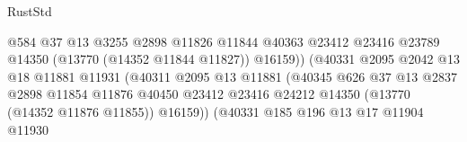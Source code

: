 \begin{lexlean}{RustStd}
\begin{coremodule}
                                                @584
                                                @37
                                                @13
                                                @3255
                                                @2898
                                                @11826
                                                @11844
                                                @40363
                                                @23412
                                                @23416
                                                @23789
                                                @14350
                                                (@13770 (@14352 @11844 @11827))
                                                @16159))
                                            (@40331
                                              @2095
                                              @2042
                                              @13
                                              @18
                                              @11881
                                              @11931
                                              (@40311
                                                @2095
                                                @13
                                                @11881
                                                (@40345
                                                  @626
                                                  @37
                                                  @13
                                                  @2837
                                                  @2898
                                                  @11854
                                                  @11876
                                                  @40450
                                                  @23412
                                                  @23416
                                                  @24212
                                                  @14350
                                                  (@13770 (@14352 @11876 @11855))
                                                  @16159))
                                              (@40331
                                                @185
                                                @196
                                                @13
                                                @17
                                                @11904
                                                @11930

\end{coremodule}
\end{lexlean}
